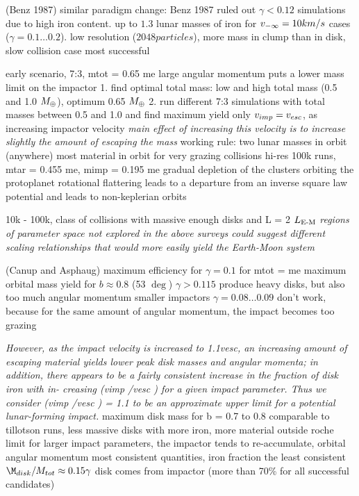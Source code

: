 \citep{Benz:1989p1893}
(Benz 1987) \citep{1987Icar...71...30B} similar paradigm change: Benz 1987  ruled out $\gamma < 0.12$ simulations due to high iron content. up to $1.3$ lunar masses of iron for $v_{-\infty} = 10km/s$ cases ($\gamma = 0.1 \dots 0.2$). low resolution ($2048 particles$), more mass in clump than in disk, slow collision case most successful


\citep{Cameron:2000p1854}
early scenario, 7:3, mtot = 0.65 me
large angular momentum puts a lower mass limit on the impactor
1. find optimal total mass: low and high total mass (0.5 and 1.0 $M_{\oplus}$), optimum 0.65 $M_{\oplus}$
2. run different 7:3 simulations with total masses between 0.5 and 1.0 and find maximum yield
only $v_{imp} = v_{esc}$, as increasing impactor velocity \emph{main effect of increasing this velocity is to increase slightly the amount of escaping the mass}
working rule: two lunar masses in orbit (anywhere)
most material in orbit for very grazing collisions
hi-res 100k runs, mtar = 0.455 me, mimp = 0.195 me
gradual depletion of the clusters orbiting the protoplanet
rotational flattering leads to a departure from an inverse square law potential and leads to non-keplerian orbits


\citep{Canup:2001p3295}
10k - 100k, class of collisions with massive enough disks and L = 2 $L_{\textrm{E-M}}$
\emph{regions of parameter space not explored in the above surveys could suggest different scaling relationships that would more easily yield the Earth-Moon system}

\cite{Canup:2001p1861} (Canup and Asphaug)
maximum efficiency for $\gamma = 0.1$ for mtot = me
maximum orbital mass yield for $b \approx 0.8 $ (53 $\deg$)
$\gamma > 0.115$ produce heavy disks, but also too much angular momentum
smaller impactors $\gamma = 0.08 \dots 0.09$ don't work, because for the same amount of angular momentum, the impact becomes too grazing


\citep{Canup:2004p115}  \emph{However, as the impact velocity is increased to 1.1vesc, an increasing amount of escaping material yields lower peak disk masses and angular momenta; in addition, there appears to be a fairly consistent increase in the fraction of disk iron with in- creasing	(vimp /vesc ) for a given impact parameter. Thus we consider (vimp /vesc ) = 1.1 to be an approximate upper limit for a potential lunar-forming impact.}
maximum disk mass for b = 0.7 to 0.8
comparable to tillotson runs, less massive disks with more iron, more material outside roche limit
for larger impact parameters, the impactor tends to re-accumulate, 
orbital angular momentum most consistent quantities, iron fraction the least consistent
$\M_{disk} / \Mtot \approx 0.15 \gamma$ 
disk comes from impactor (more than 70\% for all successful candidates)

